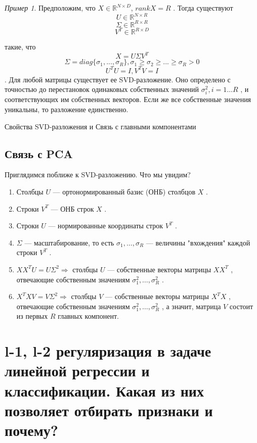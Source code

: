 \documentclass[a4paper, 12pt]{article}
\renewcommand{\geq}{\geqslant}
\theoremstyle{plain} %
\theoremstyle{definition} %
\theoremstyle{remark} %
\newtheorem{example}{Пример}
\begin{document}
\begin{example}
Предположим, что $ X \in \mathbb{R}^{N \times D}$, $rank X = R $
.
Тогда существуют
\[
 	U \in \mathbb{R}^{N \times R}
\]
\[
	\Sigma \in \mathbb{R}^{R \times R}
\]
\[
	V^T \in \mathbb{R}^{R \times D}
\]

такие, что
\[
	X = U\Sigma V^T
\]
\[
	\Sigma = diag\{\sigma_1, ..., \sigma_R\}, \sigma_1 \geq \sigma_2 \geq ... \geq \sigma_R > 0
\]
\[
	U^TU=I, V^TV=I
\]
.
Для любой матрицы существует ее SVD-разложение. Оно определено с точностью до перестановок одинаковых собственных значений $ \sigma_i^2, i = 1 \dots R $
, и соответствующих им собственных векторов. Если же все собственные значения уникальны, то разложение единственно.

 Свойства SVD-разложения и Связь с главными компонентами

\subsection{Связь с PCA}

Приглядимся поближе к SVD-разложению. Что мы увидим?
\begin{enumerate}
	\item Столбцы $ U $
    — ортонормированный базис (ОНБ) столбцов $ X $
   .
   	\item Строки $ V^T $
    — ОНБ строк $ X $
   .
   	\item Строки $ U $
    — нормированные координаты строк $ V^T $
   .
   	\item $ \Sigma $
    — масштабирование, то есть $ \sigma_1, \dots, \sigma_R $
    — величины "вхождения" каждой строки $ V^T $
   .
   	\item $ X X^T U = U \Sigma^2 \Rightarrow $
    столбцы $ U $
    — собственные векторы матрицы $ X X^T $
   , отвечающие собственным значениям  $ \sigma_1^2, \dots, \sigma_R^2 $
   .
   	\item $ X^T X V = V \Sigma^2  \Rightarrow $
    столбцы $ V $
    — собственные векторы матрицы $ X^T X $
   , отвечающие собственным значениям  $ \sigma_1^2, \dots, \sigma_R^2 $
   , а значит, матрица $ V $
    состоит из первых $ R $
    главных компонент.
\end{enumerate}

\section{l-1, l-2 регуляризация в задаче линейной регрессии и классификации. Какая из них позволяет отбирать признаки и почему?}


\end{example}
\end{document}
